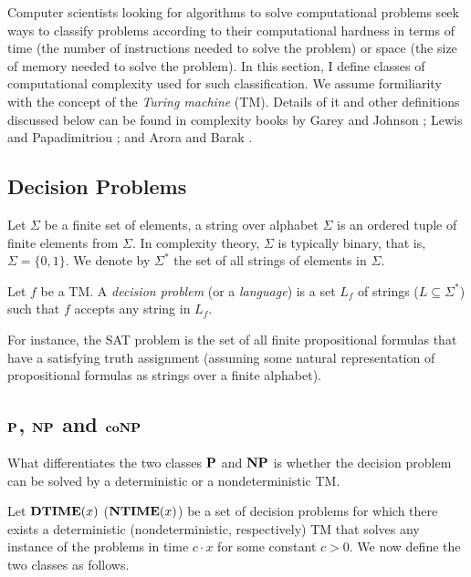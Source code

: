 Computer scientists looking for algorithms to solve computational problems
seek ways to classify problems according to their computational hardness
in terms of time (the number of instructions needed to solve the problem) 
or space (the size of memory needed to solve the problem).
In this section, I define classes of computational
complexity used for such classification.
We assume formiliarity with the concept of the \textit{Turing machine} (TM).
Details of it and other definitions discussed below can be found in complexity
books by Garey and Johnson \cite{gar-joh:b:int}; Lewis and Papadimitriou
\cite{Lewis:Comput}; and Arora and Barak \cite{Arora:Comput}.



\subsection{Decision Problems}
Let $\Sigma$ be a finite set of elements, a string over alphabet $\Sigma$
is an ordered tuple of finite elements from $\Sigma$. In complexity theory,
$\Sigma$ is typically binary, that is, $\Sigma=\{0,1\}$.
We denote by $\Sigma^*$ the set of all strings of elements in $\Sigma$.

\begin{definition}
	Let $f$ be a TM.
	A \textit{decision problem} (or a \textit{language}) is a set 
	$L_f$ of strings ($L \subseteq \Sigma^*$) such that $f$ accepts
	any string in $L_f$.
\end{definition}
For instance, the SAT problem is the set of all finite propositional
formulas that have a satisfying truth assignment (assuming some natural
representation of propositional formulas as strings over a finite alphabet).



\subsection{$\textbf{P}$, $\textbf{NP}$ and $\textbf{coNP}$}
What differentiates the two classes $\textbf{P}$ and $\textbf{NP}$ is whether the decision problem
can be solved by a deterministic or a nondeterministic TM. \cite{Arora:Comput}

Let $\textbf{DTIME}(x)$ ($\textbf{NTIME}(x)$) be a set of decision problems 
for which there exists a deterministic (nondeterministic, respectively) TM
that solves any instance of the problems in time $c\cdot x$ for some
constant $c>0$.
We now define the two classes as follows.

